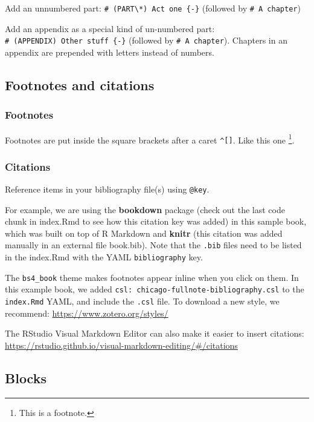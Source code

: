 \documentclass[
]{bxjsbook}
\theoremstyle{definition}
\theoremstyle{definition}
\theoremstyle{definition}
\theoremstyle{definition}
\theoremstyle{remark}
\begin{document}
Add an unnumbered part: \texttt{\#\ (PART\textbackslash{}*)\ Act\ one\ \{-\}} (followed by \texttt{\#\ A\ chapter})

Add an appendix as a special kind of un-numbered part: \texttt{\#\ (APPENDIX)\ Other\ stuff\ \{-\}} (followed by \texttt{\#\ A\ chapter}). Chapters in an appendix are prepended with letters instead of numbers.

\hypertarget{footnotes-and-citations}{%
\subsection{Footnotes and citations}\label{footnotes-and-citations}}

\hypertarget{footnotes}{%
\subsubsection{Footnotes}\label{footnotes}}

Footnotes are put inside the square brackets after a caret \texttt{\^{}{[}{]}}. Like this one \footnote{This is a footnote.}.

\hypertarget{citations}{%
\subsubsection{Citations}\label{citations}}

Reference items in your bibliography file(s) using \texttt{@key}.

For example, we are using the \textbf{bookdown} package \citep{R-bookdown} (check out the last code chunk in index.Rmd to see how this citation key was added) in this sample book, which was built on top of R Markdown and \textbf{knitr} \citep{xie2015} (this citation was added manually in an external file book.bib).
Note that the \texttt{.bib} files need to be listed in the index.Rmd with the YAML \texttt{bibliography} key.

The \texttt{bs4\_book} theme makes footnotes appear inline when you click on them. In this example book, we added \texttt{csl:\ chicago-fullnote-bibliography.csl} to the \texttt{index.Rmd} YAML, and include the \texttt{.csl} file. To download a new style, we recommend: \url{https://www.zotero.org/styles/}

The RStudio Visual Markdown Editor can also make it easier to insert citations: \url{https://rstudio.github.io/visual-markdown-editing/\#/citations}

\hypertarget{blocks}{%
\subsection{Blocks}\label{blocks}}
\end{document}
